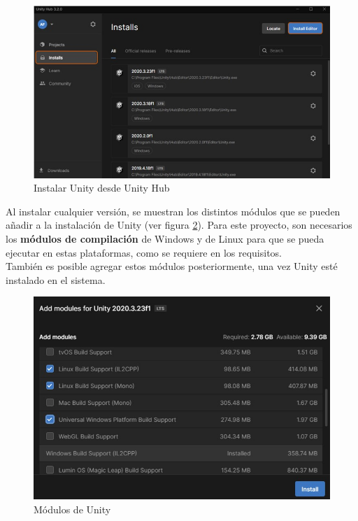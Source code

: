 \begin{figure}[h]
    \centering
    \includegraphics[scale=0.45]{img/UnityInstall.jpg}
    \caption{Instalar Unity desde Unity Hub}
    \label{fig:InstalarUnity}
    \end{figure}
    
Al instalar cualquier versión, se muestran los distintos módulos que se pueden añadir a la instalación de Unity (ver figura \ref{fig:MódulosUnity}). Para este proyecto, son necesarios los \textbf{módulos de compilación} de Windows y de Linux para que se pueda ejecutar en estas plataformas, como se requiere en los requisitos.\\
También es posible agregar estos módulos posteriormente, una vez Unity esté instalado en el sistema.

\begin{figure}[h]
    \centering
    \includegraphics[scale=0.45]{img/UnityModules.jpg}
    \caption{Módulos de Unity}
    \label{fig:MódulosUnity}
    \end{figure}

